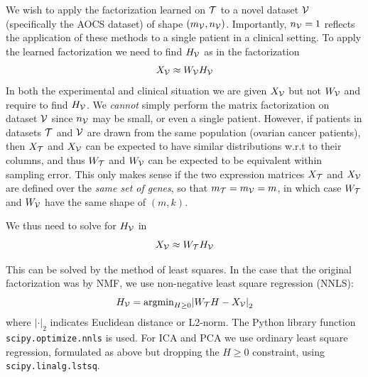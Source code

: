 \documentclass[tikz, 12pt,a4paper,oneside,fleqn]{article}
\begin{document}
We wish to apply the factorization learned on $\mathcal{T}$ to a novel dataset $\mathcal{V}$ (specifically the AOCS dataset) of shape $(m_{\mathcal{V}}, n_{\mathcal{V}})$. 
Importantly, $n_{\mathcal{V}} = 1$ reflects the application of these methods to a single patient in a clinical setting.  To apply the learned factorization we need to find $H_{\mathcal{V}}$ as in the factorization
\begin{equation}
	X_{\mathcal{V}} \approx W_{\mathcal{V}} H_{\mathcal{V}}
\end{equation}
In both the experimental and clinical situation we are given $X_{\mathcal{V}}$ but not $W_{\mathcal{V}}$ and require to find $H_{\mathcal{V}}$. 
We \emph{cannot} simply perform the matrix factorization on dataset $\mathcal{V}$ since $n_{\mathcal{V}}$ may be small, or even a single patient.   
However, if patients in datasets $\mathcal{T}$ and $\mathcal{V}$ are drawn from the same population (ovarian cancer patients), then $X_{\mathcal{T}}$ and $X_{\mathcal{V}}$ can be expected to have similar distributions w.r.t to their columns, and thus $W_{\mathcal{T}}$ and $W_{\mathcal{V}}$ can be expected to be equivalent within sampling error.  
This only makes sense if the two expression matrices $X_{\mathcal{T}}$ and $X_{\mathcal{V}}$ are defined over the \emph{same set of genes}, so that $m_{\mathcal{T}} = m_{\mathcal{V}} = m$, in which case $W_{\mathcal{T}}$ and $W_{\mathcal{V}}$ have the same shape of $(m, k)$.   

We thus need to solve for $H_{\mathcal{V}}$ in
\begin{equation}
	X_{\mathcal{V}}  \approx  W_{\mathcal{T}} H_{\mathcal{V}} \label{eq_Xv_WtHv}
\end{equation}

This can be solved by the method of least squares.  In the case that the original factorization was by NMF, we use non-negative least square regression (NNLS):
\begin{equation}
	H_{\mathcal{V}} = \mbox{argmin}_{H\geq 0}{\lvert W_{\mathcal{T}} H - X_{\mathcal{V}} \rvert}_2
	\label{eq_Hv_WdtXv}
\end{equation}
where ${\lvert \mathbf{\cdot} \rvert}_2$ indicates Euclidean distance or L2-norm.
The Python library function {\tt scipy.optimize.nnls} is used.
For ICA and PCA we use ordinary least square regression, formulated as above but dropping the $H\geq 0$ constraint, using {\tt scipy.linalg.lstsq}.

\end{document}
